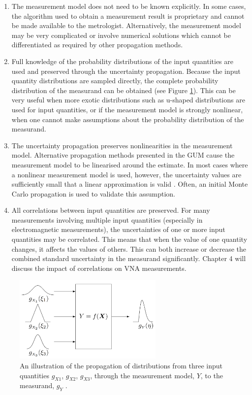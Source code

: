 \documentclass[../thesis/thesis.tex]{subfiles}
\begin{document}
\begin{refsection}
\begin{enumerate}
	\item The measurement model does not need to be known explicitly. In some cases, the algorithm used to obtain a measurement result is proprietary and cannot be made available to the metrologist. Alternatively, the measurement model may be very complicated or involve numerical solutions which cannot be differentiated as required by other propagation methods.
	\item Full knowledge of the probability distributions of the input quantities are used and preserved through the uncertainty propagation. Because the input quantity distributions are sampled directly, the complete probability distribution of the measurand can be obtained (see Figure \ref{ch3_fig_distributions}). This can be very useful when more exotic distributions such as u-shaped distributions are used for input quantities, or if the measurement model is strongly nonlinear, when one cannot make assumptions about the probability distribution of the measurand.
	\item The uncertainty propagation preserves nonlinearities in the measurement model. Alternative propagation methods presented in the GUM cause the measurement model to be linearised around the estimate. In most cases where a nonlinear measurement model is used, however, the uncertainty values are sufficiently small that a linear approximation is valid \cite[5.1.5]{GUM_2008}. Often, an initial Monte Carlo propagation is used to validate this assumption.
	\item All correlations between input quantities are preserved. For many measurements involving multiple input quantities (especially in electromagnetic measurements), the uncertainties of one or more input quantities may be correlated. This means that when the value of one quantity changes, it affects the values of others. This can both increase or decrease the combined standard uncertainty in the measurand significantly. Chapter 4 will discuss the impact of correlations on VNA measurements.
\end{enumerate}

\begin{figure}
	\centering
	\includegraphics[width=0.65\textwidth]{distributions}
	\caption[Propagation of probability distributions used in GUM Supplement 1.]{An illustration of the propagation of distributions from three input quantities $g_{X1}$, $g_{X2}$, $g_{X3}$, through the measurement model, $Y$, to the measurand, $g_{Y}$ \cite{GUM_S1}.}
	\label{ch3_fig_distributions}
\end{figure}


\end{refsection}
\end{document}
